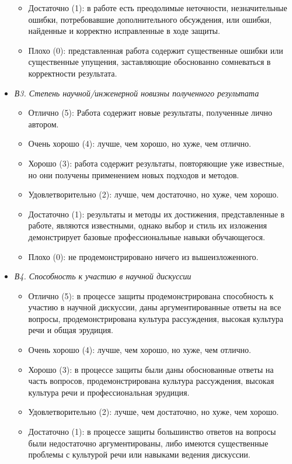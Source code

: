 \documentclass{article}
\begin{document}
\begin{itemize}
\begin{itemize}
        \item Достаточно (1): в работе есть преодолимые неточности, незначительные ошибки, потребовавшие дополнительного обсуждения, или ошибки, найденные и корректно исправленные в ходе защиты.
        \item Плохо (0): представленная работа содержит существенные ошибки или существенные упущения, заставляющие обоснованно сомневаться в корректности результата.
    \end{itemize}
    \item \textit{В3. Степень научной/инженерной новизны полученного результата}
    \begin{itemize}
        \item Отлично (5): Работа содержит новые результаты, полученные лично автором.
        \item Очень хорошо (4): лучше, чем хорошо, но хуже, чем отлично.
        \item Хорошо (3): работа содержит результаты, повторяющие уже известные, но они получены применением новых подходов и методов.
        \item Удовлетворительно (2): лучше, чем достаточно, но хуже, чем хорошо.
        \item Достаточно (1): результаты и методы их достижения, представленные в работе, являются известными, однако выбор и стиль их изложения демонстрирует базовые профессиональные навыки обучающегося.
        \item Плохо (0): не продемонстрировано ничего из вышеизложенного. 
    \end{itemize}
    \item \textit{В4. Способность к участию в научной дискуссии}
    \begin{itemize}
        \item Отлично (5): в процессе защиты продемонстрирована способность к участию в научной дискуссии, даны аргументированные ответы на все вопросы, продемонстрирована культура рассуждения, высокая культура речи и общая эрудиция.
        \item Очень хорошо (4): лучше, чем хорошо, но хуже, чем отлично.
        \item Хорошо (3): в процессе защиты были даны обоснованные ответы на часть вопросов, продемонстрирована культура рассуждения, высокая культура речи и профессиональная эрудиция.
        \item Удовлетворительно (2): лучше, чем достаточно, но хуже, чем хорошо.
        \item Достаточно (1): в процессе защиты большинство ответов на вопросы были недостаточно аргументированы, либо имеются существенные проблемы с культурой речи или навыками ведения дискуссии.

\end{itemize}
\end{itemize}
\end{document}
